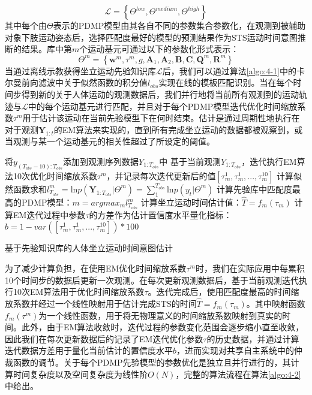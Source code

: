 \begin{equation}
    \mathscr{L}=\left\{\Theta^{low}, \Theta^{medium}, \Theta^{high}\right\}
    \label{eq:4-37}
\end{equation}
其中每个由$\Theta$表示的PDMP模型由其各自不同的参数集合参数化，在观测到被辅助对象下肢运动姿态后，选择匹配度最好的模型的预测结果作为STS运动时间意图推断的结果。库中第$m$个运动基元可通过以下的参数化形式表示：
\begin{equation}
    \Theta ^{m}=\left\{\mathbf{w}^{m}, \tau^{m}, g, \mathbf{A}_1, \mathbf{A}_2, \mathbf{B}, \mathbf{C}, \mathbf{Q}^{m}, \mathbf{R}^{m}\right\}
    \label{eq:4-38}
\end{equation}
当通过离线示教获得坐立运动先验知识库$\mathscr{L}$后，我们可以通过算法\ref{algo:4-1}中的卡尔曼前向滤波中关于似然函数的积分值$l_{obs}$实现在线的模板匹配识别。当在每个时间步得到新的关于人体运动的观测数据后，我们并行地将当前所有观测到的运动轨迹与$\mathscr{L}$中的每个运动基元进行匹配，并且对于每个PDMP模型迭代优化时间缩放系数$\tau^{m}$用于估计该运动在当前先验模型下在何时结束。估计是通过周期性地执行在对于观测$\mathbf{Y}_{1:t}$的EM算法来实现的，直到所有完成坐立运动的数据都被观察到，或当观测与某一个运动基元的相关性超过了所设定的阈值。
\begin{algorithm}[htb]
    \SetAlgoLined
    {
        将$y_{{(T_{obs}-10)}:T_{obs}}$添加到观测序列数据$Y_{1:T_{obs}}$中 \;
        {
            基于当前观测$Y_{1:T_{obs}}$，迭代执行EM算法10次优化时间缩放系数$\tau^m$，并记录每次迭代更新后的值$[\tau_m^1,\tau_m^1,...,\tau_m^{10}]$\;
            计算似然函数求和$l_{T_{obs}}^m=\text{ln}p(\mathbf{Y}_{1:T_{obs}}|\Theta ^{m})=\sum_{1}^{T_{obs}} \text{ln}p(y_t|\Theta ^{m})$ \;
        }
        计算先验库中匹配度最高的PDMP模型：$m=argmax_m l_{T_{obs}}^m$\;
        计算坐立运动时间估计值：$\hat T = f_m(\tau_m)$\;
        计算EM迭代过程中参数$\tau$的方差作为估计置信度水平量化指标：$b = 1 - var([\tau_m^1,\tau_m^1,...,\tau_m^{10}]) * 100$\;
    }
    \caption{基于先验知识库的人体坐立运动时间意图估计}
    \label{algo:4-2}
\end{algorithm}

为了减少计算负担，在使用EM优化时间缩放系数$\tau^{m}$时，我们在实际应用中每累积10个时间步的数据后更新一次观测。在每次更新观测数据后，基于当前观测迭代执行10次EM算法用于优化时间缩放系数$\tau$。迭代完成后，使用匹配度最高的时间缩放系数并经过一个线性映射用于估计完成STS的时间$\hat T=f_m(\tau_m)$。其中映射函数$f_m(\tau^m)$为一个线性函数，用于将无物理意义的时间缩放系数映射到真实的时间。此外，由于EM算法收敛时，迭代过程的参数变化范围会逐步缩小直至收敛，因此我们在每次更新数据后的记录了EM迭代优化参数$\tau$的历史数据，并通过计算迭代数据方差用于量化当前估计的置信度水平$b$，进而实现对共享自主系统中的仲裁函数的调节。关于每个PDMP先验模型的参数优化是独立且并行进行的，其计算时间复杂度以及空间复杂度为线性阶$O(N)$，完整的算法流程在算法\ref{algo:4-2}中给出。

